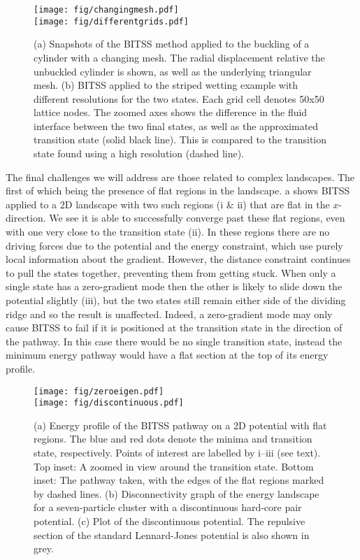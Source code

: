 \documentclass[aps,prl,twocolumn,groupedaddress]{revtex4}
\begin{document}
\begin{figure}[tb]
  \texttt{[image: fig/changingmesh.pdf]}\\
  \texttt{[image: fig/differentgrids.pdf]}
  \caption{\label{fig:adaptivemesh}
    (a) Snapshots of the BITSS method applied to the buckling of a cylinder with a changing mesh.
        The radial displacement relative the unbuckled cylinder is shown, as well as the underlying triangular mesh.
    (b) BITSS applied to the striped wetting example with different resolutions for the two states.
        Each grid cell denotes 50x50 lattice nodes.
        The zoomed axes shows the difference in the fluid interface between the two final states, as well as the approximated transition state (solid black line).
        This is compared to the transition state found using a high resolution (dashed line).
  }
\end{figure}


\topic The final challenges we will address are those related to complex landscapes.
The first of which being the presence of flat regions in the landscape.
a shows BITSS applied to a 2D landscape with two such regions (i \& ii) that are flat in the $x$-direction.
We see it is able to successfully converge past these flat regions, even with one very close to the transition state (ii).
In these regions there are no driving forces due to the potential and the energy constraint, which use purely local information about the gradient.
However, the distance constraint continues to pull the states together, preventing them from getting stuck.
When only a single state has a zero-gradient mode then the other is likely to slide down the potential slightly (iii), but the two states still remain either side of the dividing ridge and so the result is unaffected.
Indeed, a zero-gradient mode may only cause BITSS to fail if it is positioned at the transition state in the direction of the pathway.
In this case there would be no single transition state, instead the minimum energy pathway would have a flat section at the top of its energy profile.

\begin{figure}[tb]
  \texttt{[image: fig/zeroeigen.pdf]}\\
  \texttt{[image: fig/discontinuous.pdf]}
  \caption{\label{fig:flatdiscontinuous}
    (a) Energy profile of the BITSS pathway on a 2D potential with flat regions.
        The blue and red dots denote the minima and transition state, respectively.
        Points of interest are labelled by i--iii (see text).
        Top inset: A zoomed in view around the transition state.
        Bottom inset: The pathway taken, with the edges of the flat regions marked by dashed lines.
    (b) Disconnectivity graph of the energy landscape for a seven-particle cluster with a discontinuous hard-core pair potential.
    (c) Plot of the discontinuous potential.
        The repulsive section of the standard Lennard-Jones potential is also shown in grey.
  }
\end{figure}
\end{document}
